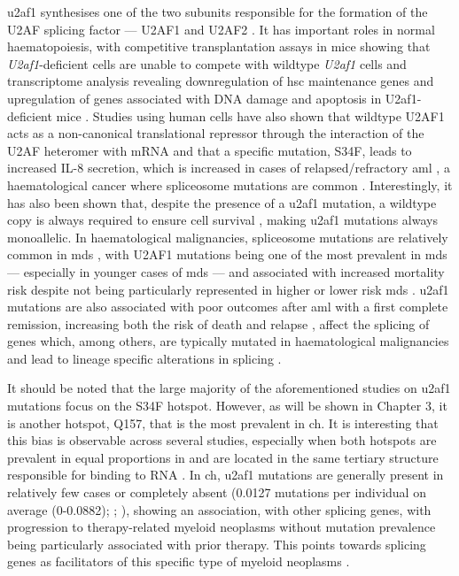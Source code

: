 \Ac{u2af1} synthesises one of the two subunits responsible for the formation of the U2AF splicing factor --- U2AF1 and U2AF2 \cite{Palangat2019-nv}. It has important roles in normal haematopoiesis, with competitive transplantation assays in mice showing that \textit{U2af1}-deficient cells are unable to compete with wildtype \textit{U2af1} cells and transcriptome analysis revealing downregulation of \ac{hsc} maintenance genes and upregulation of genes associated with DNA damage and apoptosis in U2af1-deficient mice \cite{Dutta2020-ah}. Studies using human cells have also shown that wildtype U2AF1 acts as a non-canonical translational repressor through the interaction of the U2AF heteromer with mRNA and that a specific mutation, S34F, leads to increased IL-8 secretion, which is increased in cases of relapsed/refractory \ac{aml} \cite{Palangat2019-nv}, a haematological cancer where spliceosome mutations are common \cite{Papaemmanuil2016-jy}. Interestingly, it has also been shown that, despite the presence of a \ac{u2af1} mutation, a wildtype copy is always required to ensure cell survival \cite{Fei2016-cc,Wadugu2020-df}, making \ac{u2af1} mutations always monoallelic. In haematological malignancies, spliceosome mutations are relatively common in \ac{mds} \cite{Yoshida2011-zp}, with U2AF1 mutations being one of the most prevalent in \ac{mds} --- especially in younger cases of \ac{mds} --- and associated with increased mortality risk despite not being particularly represented in higher or lower risk \ac{mds} \cite{Li2018-vz}. \ac{u2af1} mutations are also associated with poor outcomes after \ac{aml} with a first complete remission, increasing both the risk of death and relapse \cite{Saygin2018-bb}, affect the splicing of genes which, among others, are typically mutated in haematological malignancies \cite{Przychodzen2013-vb} and lead to lineage specific alterations in splicing \cite{Yip2017-kf}. 

It should be noted that the large majority of the aforementioned studies on \ac{u2af1} mutations focus on the S34F hotspot. However, as will be shown in Chapter 3, it is another hotspot, Q157, that is the most prevalent in \ac{ch}. It is interesting that this bias is observable across several studies, especially when both hotspots are prevalent in equal proportions in and are located in the same tertiary structure responsible for binding to RNA \cite{Adema2016-fa}. In \ac{ch}, \ac{u2af1} mutations are generally present in relatively few cases or completely absent \cite{Jaiswal2014-rl,Genovese2014-eu,Zink2017-zi,Bolton2020-ct,Coombs2017-ph,Acuna-Hidalgo2017-ng,Desai2018-pj,Young2016-du,Young2019-rz} (0.0127 mutations per individual on average (0-0.0882); ; ), showing an association, with other splicing genes, with progression to therapy-related myeloid neoplasms without mutation prevalence being particularly associated with prior therapy. This points towards splicing genes as facilitators of this specific type of myeloid neoplasms \cite{Bolton2020-ct}. 

